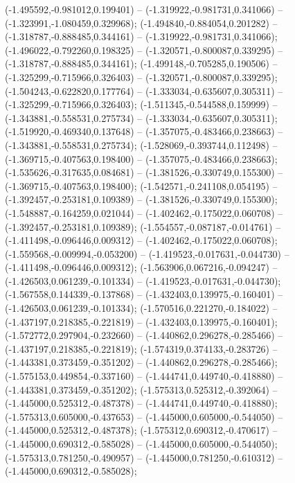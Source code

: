  (-1.495592,-0.981012,0.199401) -- (-1.319922,-0.981731,0.341066) -- (-1.323991,-1.080459,0.329968);
 (-1.494840,-0.884054,0.201282) -- (-1.318787,-0.888485,0.344161) -- (-1.319922,-0.981731,0.341066);
 (-1.496022,-0.792260,0.198325) -- (-1.320571,-0.800087,0.339295) -- (-1.318787,-0.888485,0.344161);
 (-1.499148,-0.705285,0.190506) -- (-1.325299,-0.715966,0.326403) -- (-1.320571,-0.800087,0.339295);
 (-1.504243,-0.622820,0.177764) -- (-1.333034,-0.635607,0.305311) -- (-1.325299,-0.715966,0.326403);
 (-1.511345,-0.544588,0.159999) -- (-1.343881,-0.558531,0.275734) -- (-1.333034,-0.635607,0.305311);
 (-1.519920,-0.469340,0.137648) -- (-1.357075,-0.483466,0.238663) -- (-1.343881,-0.558531,0.275734);
 (-1.528069,-0.393744,0.112498) -- (-1.369715,-0.407563,0.198400) -- (-1.357075,-0.483466,0.238663);
 (-1.535626,-0.317635,0.084681) -- (-1.381526,-0.330749,0.155300) -- (-1.369715,-0.407563,0.198400);
 (-1.542571,-0.241108,0.054195) -- (-1.392457,-0.253181,0.109389) -- (-1.381526,-0.330749,0.155300);
 (-1.548887,-0.164259,0.021044) -- (-1.402462,-0.175022,0.060708) -- (-1.392457,-0.253181,0.109389);
 (-1.554557,-0.087187,-0.014761) -- (-1.411498,-0.096446,0.009312) -- (-1.402462,-0.175022,0.060708);
 (-1.559568,-0.009994,-0.053200) -- (-1.419523,-0.017631,-0.044730) -- (-1.411498,-0.096446,0.009312);
 (-1.563906,0.067216,-0.094247) -- (-1.426503,0.061239,-0.101334) -- (-1.419523,-0.017631,-0.044730);
 (-1.567558,0.144339,-0.137868) -- (-1.432403,0.139975,-0.160401) -- (-1.426503,0.061239,-0.101334);
 (-1.570516,0.221270,-0.184022) -- (-1.437197,0.218385,-0.221819) -- (-1.432403,0.139975,-0.160401);
 (-1.572772,0.297904,-0.232660) -- (-1.440862,0.296278,-0.285466) -- (-1.437197,0.218385,-0.221819);
 (-1.574319,0.374133,-0.283726) -- (-1.443381,0.373459,-0.351202) -- (-1.440862,0.296278,-0.285466);
 (-1.575153,0.449854,-0.337160) -- (-1.444741,0.449740,-0.418880) -- (-1.443381,0.373459,-0.351202);
 (-1.575313,0.525312,-0.392064) -- (-1.445000,0.525312,-0.487378) -- (-1.444741,0.449740,-0.418880);
 (-1.575313,0.605000,-0.437653) -- (-1.445000,0.605000,-0.544050) -- (-1.445000,0.525312,-0.487378);
 (-1.575312,0.690312,-0.470617) -- (-1.445000,0.690312,-0.585028) -- (-1.445000,0.605000,-0.544050);
 (-1.575313,0.781250,-0.490957) -- (-1.445000,0.781250,-0.610312) -- (-1.445000,0.690312,-0.585028);
